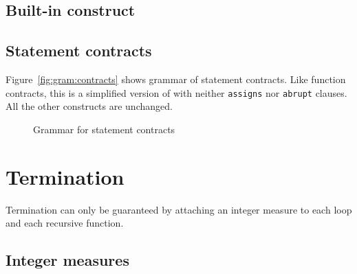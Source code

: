 
\subsection{Built-in construct \texorpdfstring{\at}{\textbackslash{}at}}
\label{sec:at}
\nodiff


\subsection{Statement contracts}
\label{sec:statement_contract}


Figure~\ref{fig:gram:contracts} shows grammar of statement contracts. Like
function contracts, this is a simplified version of \acsl with neither
\lstinline|assigns| nor \lstinline|abrupt| clauses.
All the other constructs are unchanged.

\begin{figure}[htbp]
  \begin{cadre}
    
  \end{cadre}
  \caption{Grammar for statement contracts}
  \label{fig:gram:stcontracts}
\end{figure}


\section{Termination}
\label{sec:termination}


Termination can only be guaranteed by attaching an integer measure to each loop
and each recursive function.


\subsection{Integer measures}
\label{sec:integermeasures}
\nodiff

